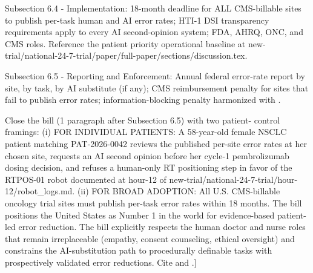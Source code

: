 Subsection 6.4 - Implementation: 18-month deadline for ALL
CMS-billable sites to publish per-task human and AI error rates;
HTI-1 DSI transparency requirements apply to every AI second-opinion
system; FDA, AHRQ, ONC, and CMS roles. Reference the patient priority
operational baseline at
new-trial/national-24-7-trial/paper/full-paper/sections/discussion.tex.

Subsection 6.5 - Reporting and Enforcement: Annual federal error-rate
report by site, by task, by AI substitute (if any); CMS
reimbursement penalty for sites that fail to publish error rates;
information-blocking penalty harmonized with
\cite{federal_register_info_blocking_disincentives_2024}.

Close the bill (1 paragraph after Subsection 6.5) with two patient-
control framings:
(i) FOR INDIVIDUAL PATIENTS: A 58-year-old female NSCLC patient
    matching PAT-2026-0042 reviews the published per-site error
    rates at her chosen site, requests an AI second opinion before
    her cycle-1 pembrolizumab dosing decision, and refuses a
    human-only RT positioning step in favor of the RTPOS-01 robot
    documented at hour-12 of
    new-trial/national-24-7-trial/hour-12/robot\_logs.md.
(ii) FOR BROAD ADOPTION: All U.S. CMS-billable oncology trial sites
     must publish per-task error rates within 18 months. The bill
     positions the United States as Number 1 in the world for
     evidence-based patient-led error reduction. The bill explicitly
     respects the human doctor and nurse roles that remain
     irreplaceable (empathy, consent counseling, ethical oversight)
     and constrains the AI-substitution path to procedurally
     definable tasks with prospectively validated error reductions.
     Cite \cite{kawchak_2026_19994945} and \cite{kawchak_2026_19119939}.]
